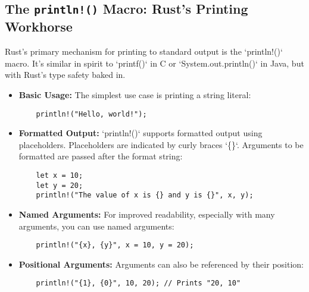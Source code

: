 \documentclass{article}
\begin{document}
{{{{\subsection*{The \texttt{println!()} Macro: Rust's Printing Workhorse}

Rust's primary mechanism for printing to standard output is the `println!()` macro.  It's similar in spirit to `printf()` in C or `System.out.println()` in Java, but with Rust's type safety baked in.

\begin{itemize}
    \item \textbf{Basic Usage:}  The simplest use case is printing a string literal:
    \begin{verbatim}
    println!("Hello, world!");
    \end{verbatim}

    \item \textbf{Formatted Output:} `println!()` supports formatted output using placeholders. Placeholders are indicated by curly braces `\{\}`.  Arguments to be formatted are passed after the format string:
    \begin{verbatim}
    let x = 10;
    let y = 20;
    println!("The value of x is {} and y is {}", x, y);
    \end{verbatim}

    \item \textbf{Named Arguments:} For improved readability, especially with many arguments, you can use named arguments:
    \begin{verbatim}
    println!("{x}, {y}", x = 10, y = 20);
    \end{verbatim}

    \item \textbf{Positional Arguments:} Arguments can also be referenced by their position:
     \begin{verbatim}
    println!("{1}, {0}", 10, 20); // Prints "20, 10"
    \end{verbatim}


\end{itemize}}}}}
\end{document}
